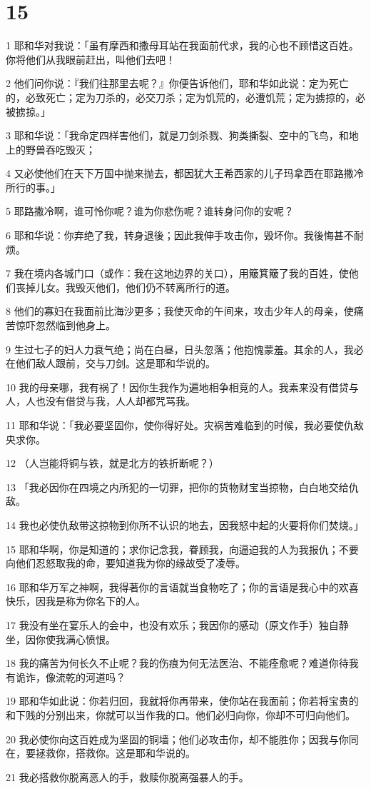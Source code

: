 \chapter{15}

\par 1 耶和华对我说：「虽有摩西和撒母耳站在我面前代求，我的心也不顾惜这百姓。你将他们从我眼前赶出，叫他们去吧！
\par 2 他们问你说：『我们往那里去呢？』你便告诉他们，耶和华如此说：定为死亡的，必致死亡；定为刀杀的，必交刀杀；定为饥荒的，必遭饥荒；定为掳掠的，必被掳掠。」
\par 3 耶和华说：「我命定四样害他们，就是刀剑杀戮、狗类撕裂、空中的飞鸟，和地上的野兽吞吃毁灭；
\par 4 又必使他们在天下万国中抛来抛去，都因犹大王希西家的儿子玛拿西在耶路撒冷所行的事。」
\par 5 耶路撒冷啊，谁可怜你呢？谁为你悲伤呢？谁转身问你的安呢？
\par 6 耶和华说：你弃绝了我，转身退後；因此我伸手攻击你，毁坏你。我後悔甚不耐烦。
\par 7 我在境内各城门口（或作：我在这地边界的关口），用簸箕簸了我的百姓，使他们丧掉儿女。我毁灭他们，他们仍不转离所行的道。
\par 8 他们的寡妇在我面前比海沙更多；我使灭命的午间来，攻击少年人的母亲，使痛苦惊吓忽然临到他身上。
\par 9 生过七子的妇人力衰气绝；尚在白昼，日头忽落；他抱愧蒙羞。其余的人，我必在他们敌人跟前，交与刀剑。这是耶和华说的。
\par 10 我的母亲哪，我有祸了！因你生我作为遍地相争相竞的人。我素来没有借贷与人，人也没有借贷与我，人人却都咒骂我。
\par 11 耶和华说：「我必要坚固你，使你得好处。灾祸苦难临到的时候，我必要使仇敌央求你。
\par 12 （人岂能将铜与铁，就是北方的铁折断呢？）
\par 13 「我必因你在四境之内所犯的一切罪，把你的货物财宝当掠物，白白地交给仇敌。
\par 14 我也必使仇敌带这掠物到你所不认识的地去，因我怒中起的火要将你们焚烧。」
\par 15 耶和华啊，你是知道的；求你记念我，眷顾我，向逼迫我的人为我报仇；不要向他们忍怒取我的命，要知道我为你的缘故受了凌辱。
\par 16 耶和华万军之神啊，我得著你的言语就当食物吃了；你的言语是我心中的欢喜快乐，因我是称为你名下的人。
\par 17 我没有坐在宴乐人的会中，也没有欢乐；我因你的感动（原文作手）独自静坐，因你使我满心愤恨。
\par 18 我的痛苦为何长久不止呢？我的伤痕为何无法医治、不能痊愈呢？难道你待我有诡诈，像流乾的河道吗？
\par 19 耶和华如此说：你若归回，我就将你再带来，使你站在我面前；你若将宝贵的和下贱的分别出来，你就可以当作我的口。他们必归向你，你却不可归向他们。
\par 20 我必使你向这百姓成为坚固的铜墙；他们必攻击你，却不能胜你；因我与你同在，要拯救你，搭救你。这是耶和华说的。
\par 21 我必搭救你脱离恶人的手，救赎你脱离强暴人的手。

